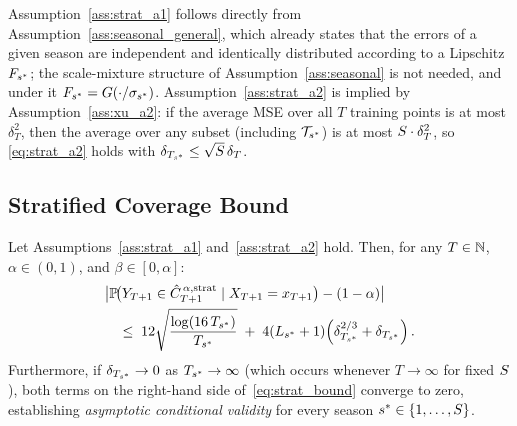 \begin{remark}
\label{rem:assumption_nesting}
Assumption~\ref{ass:strat_a1} follows directly from
Assumption~\ref{ass:seasonal_general}, which already states that the
errors of a given season are independent and identically distributed
according to a Lipschitz $F_{s^*}$; the scale-mixture structure of
Assumption~\ref{ass:seasonal} is not needed, and under it
$F_{s^*} = G(\cdot/\sigma_{s^*})$.
Assumption~\ref{ass:strat_a2} is implied by
Assumption~\ref{ass:xu_a2}: if the average MSE over all $T$
training points is at most $\delta_T^2$, then the average
over any subset (including $\mathcal{T}_{s^*}$) is at most
$S \cdot \delta_T^2$, so \eqref{eq:strat_a2} holds with
$\delta_{T_{s^*}} \leq \sqrt{S}\,\delta_T$.
\end{remark}

\subsection{Stratified Coverage Bound}
\label{sec:theory:main}

\begin{theorem}
\label{thm:strat_coverage}
Let Assumptions~\ref{ass:strat_a1} and~\ref{ass:strat_a2} hold.
Then, for any $T \in \mathbb{N}$, $\alpha \in (0,1)$, and
$\beta \in [0,\alpha]$:
\begin{align}
  \label{eq:strat_bound}
  &\bigl|
    \mathbb{P}\!\bigl(
      Y_{T+1} \in \hat{C}_{T+1}^{\,\alpha,\textup{strat}}
      \mid X_{T+1} = x_{T+1}
    \bigr) - (1-\alpha)
  \bigr|
  \notag\\
  &\quad\leq\;
  12\sqrt{\frac{\log(16\,T_{s^*})}{T_{s^*}}}
  \;+\;
  4(L_{s^*}+1)\!\left(\delta_{T_{s^*}}^{2/3} + \delta_{T_{s^*}}\right).
\end{align}
Furthermore, if $\delta_{T_{s^*}} \to 0$ as $T_{s^*} \to \infty$
(which occurs whenever $T \to \infty$ for fixed $S$),
both terms on the right-hand side of~\eqref{eq:strat_bound}
converge to zero, establishing \emph{asymptotic conditional
validity} for every season $s^* \in \{1,\ldots,S\}$.
\end{theorem}

